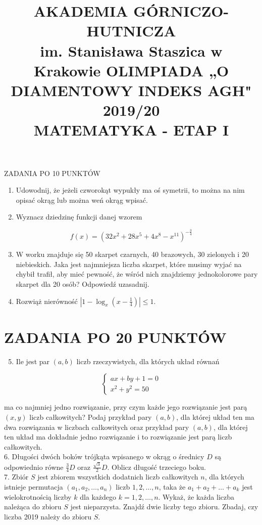 \documentclass[10pt]{article}
\title{AKADEMIA GÓRNICZO-HUTNICZA \\
 im. Stanisława Staszica w Krakowie OLIMPIADA „O DIAMENTOWY INDEKS AGH" 2019/20 \\
 MATEMATYKA - ETAP I }
\author{}
\date{}
\begin{document}
\maketitle
ZADANIA PO 10 PUNKTÓW

\begin{enumerate}
  \item Udowodnij, że jeżeli czworokąt wypukły ma oś symetrii, to można na nim opisać okrąg lub można weń okrąg wpisać.
  \item Wyznacz dziedzinę funkcji danej wzorem
\end{enumerate}

$$
f(x)=\left(32 x^{2}+28 x^{5}+4 x^{8}-x^{11}\right)^{-\frac{3}{4}}
$$

\begin{enumerate}
  \setcounter{enumi}{2}
  \item W worku znajduje się 50 skarpet czarnych, 40 brazowych, 30 zielonych i 20 niebieskich. Jaka jest najmniejsza liczba skarpet, które musimy wyjać na chybił trafił, aby mieć pewność, że wśród nich znajdziemy jednokolorowe pary skarpet dla 20 osób? Odpowiedź uzasadnij.
  \item Rozwiąż nierówność $\left|1-\log _{x}\left(x-\frac{1}{4}\right)\right| \leqslant 1$.
\end{enumerate}

\section*{ZADANIA PO 20 PUNKTÓW}
\begin{enumerate}
  \setcounter{enumi}{4}
  \item Ile jest par $(a, b)$ liczb rzeczywistych, dla których układ równań
\end{enumerate}

$$
\left\{\begin{array}{c}
a x+b y+1=0 \\
x^{2}+y^{2}=50
\end{array}\right.
$$

ma co najmniej jedno rozwiązanie, przy czym każde jego rozwiązanie jest parą $(x, y)$ liczb całkowitych? Podaj przykład pary $(a, b)$, dla której układ ten ma dwa rozwiązania w liczbach całkowitych oraz przykład pary $(a, b)$, dla której ten układ ma dokładnie jedno rozwiązanie i to rozwiązanie jest parą liczb całkowitych.\\
6. Długości dwóch boków trójkąta wpisanego w okrąg o średnicy $D$ są odpowiednio równe $\frac{3}{4} D$ oraz $\frac{\sqrt{3}}{2} D$. Oblicz długość trzeciego boku.\\
7. Zbiór $S$ jest zbiorem wszystkich dodatnich liczb całkowitych $n$, dla których istnieje permutacja $\left(a_{1}, a_{2}, \ldots, a_{n}\right)$ liczb $1,2, \ldots, n$, taka że $a_{1}+a_{2}+\ldots+a_{k}$ jest wielokrotnością liczby $k$ dla każdego $k=1,2, \ldots, n$. Wykaż, że każda liczba należąca do zbioru $S$ jest nieparzysta. Znajdź dwie liczby tego zbioru. Zbadaj, czy liczba 2019 należy do zbioru $S$.
\end{document}
